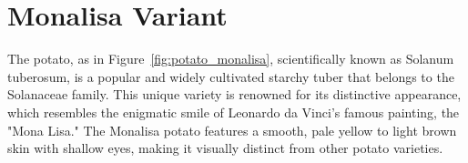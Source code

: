 \documentclass[../../../../main.tex]{subfiles}
\begin{document}

\onlyonsectionfile{
}





    





% 
% 



% 

\section{Monalisa Variant}

% 



The  potato, as in Figure~\ref{fig:potato_monalisa}, scientifically known as Solanum tuberosum, is a popular and widely cultivated starchy tuber that belongs to the Solanaceae family. This unique variety is renowned for its distinctive appearance, which resembles the enigmatic smile of Leonardo da Vinci's famous painting, the "Mona Lisa." The Monalisa potato features a smooth, pale yellow to light brown skin with shallow eyes, making it visually distinct from other potato varieties.
\end{document}
